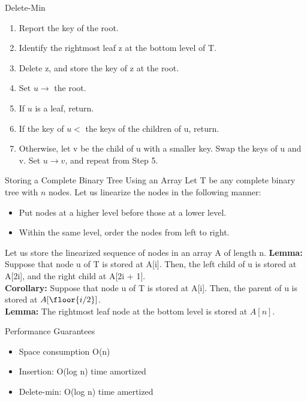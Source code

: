 \documentclass{lecture}
\begin{document}
\begin{landscape}
\begin{multicols}{2}
\begin{note}{Delete-Min}
        \begin{enumerate}[nolistsep]
            \item Report the key of the root.
            \item Identify the rightmost leaf z at the bottom level of T.
            \item Delete z, and store the key of z at the root.
            \item Set $u\rightarrow$ the root.
            \item If $u$ is a leaf, return.
            \item If the key of $u <$ the keys of the children of u, return.
            \item Otherwise, let v be the child of u with a smaller key. Swap the keys of u and v. Set $u\rightarrow v$, and repeat from Step 5.
        \end{enumerate}
    \end{note}
    \vfill

    \begin{note}{Storing a Complete Binary Tree Using an Array}
        Let T be any complete binary tree with $n$ nodes. Let us linearize the nodes in the following manner:
        \begin{itemize}[nolistsep]
            \item Put nodes at a higher level before those at a lower level.
            \item Within the same level, order the nodes from left to right.
        \end{itemize}
        Let us store the linearized sequence of nodes in an array A of length n.
        \textbf{Lemma:} Suppose that node u of T is stored at A[i]. Then, the left child of u is stored at A[2i], and the right child at A[2i + 1].\\
        \textbf{Corollary:} Suppose that node u of T is stored at A[i]. Then, the parent of u is stored at $A[\floor{i/2}]$.\\
        \textbf{Lemma:} The rightmost leaf node at the bottom level is stored at $A[n]$.
    \end{note}
    \vfill
    \begin{note}{Performance Guarantees}
        \begin{itemize}
            \item Space consumption O(n)
            \item Insertion: O(log n) time amortized
            \item Delete-min: O(log n) time amertized
        \end{itemize}
    \end{note}

\end{multicols}

\end{landscape}
\end{document}
